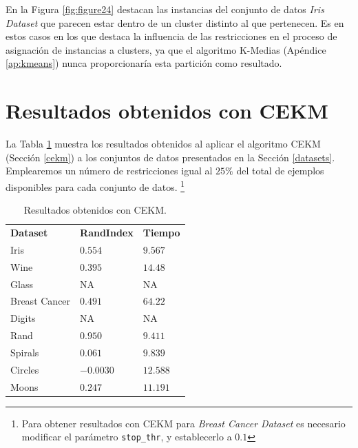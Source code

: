 En la Figura \ref{fig:figure24} destacan las instancias del conjunto de datos \textit{Iris Dataset} que parecen estar dentro de un cluster distinto al que pertenecen. Es en estos casos en los que destaca la influencia de las restricciones en el proceso de asignación de instancias a clusters, ya que el algoritmo K-Medias (Apéndice \ref{ap:kmeans}) nunca proporcionaría esta partición como resultado.

\clearpage

\section{Resultados obtenidos con CEKM}

La Tabla \ref{tab:tabla8} muestra los resultados obtenidos al aplicar el algoritmo \acf{CEKM} (Sección \ref{cekm}) a los conjuntos de datos presentados en la Sección \ref{datasets}. Emplearemos un número de restricciones igual al $25\%$ del total de ejemplos disponibles para cada conjunto de datos. \footnote{Para obtener resultados con \acs{CEKM} para \textit{Breast Cancer Dataset} es necesario modificar el parámetro \texttt{stop\_thr}, y establecerlo a $0.1$ }

\begin{table}[!h]
	\centering
	\setlength{\arrayrulewidth}{1mm}
	\setlength{\tabcolsep}{10pt}
	\renewcommand{\arraystretch}{0.9}
	
	\begin{tabular}{ >{\centering\arraybackslash}m{2.5cm}  >{\centering\arraybackslash}m{1.8cm}>{\centering\arraybackslash}m{1.5cm}}
		\hline
		\rowcolor{black}
		\multicolumn{3}{c}{\bf \color{white}{Resultados obtenidos con CEKM}}\\
		\hline
		\rowcolor{gray!50}
		\textbf{Dataset} & \textbf{RandIndex} & \textbf{Tiempo}  \\
		Iris & $0.554$ & $9.567$  \\
		Wine & $0.395$ & $14.48$  \\
		Glass & NA & NA  \\
		Breast Cancer & $0.491$ & $64.22$  \\
		Digits & NA & NA  \\
		Rand & $0.950$ & $9.411$  \\
		Spirals & $0.061$ & $9.839$  \\
		Circles & $-0.0030$ & $12.588$  \\
		Moons & $0.247$ & $11.191$  \\
		\hline
		
	\end{tabular}
	\caption{Resultados obtenidos con \acs{CEKM}.}
	\label{tab:tabla8}
\end{table}

